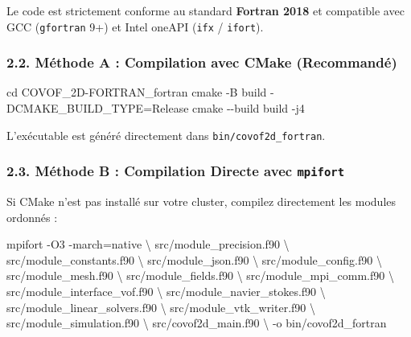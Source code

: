 \documentclass[
  french,
]{article}
\newenvironment{Shaded}{}{}
\newcommand{\AttributeTok}[1]{\textcolor[rgb]{0.49,0.56,0.16}{#1}}
\newcommand{\BuiltInTok}[1]{\textcolor[rgb]{0.00,0.50,0.00}{#1}}
\newcommand{\DataTypeTok}[1]{\textcolor[rgb]{0.56,0.13,0.00}{#1}}
\newcommand{\ExtensionTok}[1]{#1}
\newcommand{\FunctionTok}[1]{\textcolor[rgb]{0.02,0.16,0.49}{#1}}
\newcommand{\NormalTok}[1]{#1}
\newcommand{\OperatorTok}[1]{\textcolor[rgb]{0.40,0.40,0.40}{#1}}
\begin{document}
Le code est strictement conforme au standard \textbf{Fortran 2018} et
compatible avec GCC (\texttt{gfortran} 9+) et Intel oneAPI (\texttt{ifx}
/ \texttt{ifort}).

\subsubsection{2.2. Méthode A : Compilation avec CMake
(Recommandé)}\label{muxe9thode-a-compilation-avec-cmake-recommanduxe9}

\begin{Shaded}
\begin{Highlighting}[]
\BuiltInTok{cd}\NormalTok{ COVOF\_2D{-}FORTRAN\_fortran}
\FunctionTok{cmake} \AttributeTok{{-}B}\NormalTok{ build }\AttributeTok{{-}DCMAKE\_BUILD\_TYPE}\OperatorTok{=}\NormalTok{Release}
\FunctionTok{cmake} \AttributeTok{{-}{-}build}\NormalTok{ build }\AttributeTok{{-}j4}
\end{Highlighting}
\end{Shaded}

L'exécutable est généré directement dans \texttt{bin/covof2d\_fortran}.

\subsubsection{\texorpdfstring{2.3. Méthode B : Compilation Directe avec
\texttt{mpifort}}{2.3. Méthode B : Compilation Directe avec mpifort}}\label{muxe9thode-b-compilation-directe-avec-mpifort}

Si CMake n'est pas installé sur votre cluster, compilez directement les
modules ordonnés :

\begin{Shaded}
\begin{Highlighting}[]
\ExtensionTok{mpifort} \AttributeTok{{-}O3} \AttributeTok{{-}march}\OperatorTok{=}\NormalTok{native }\DataTypeTok{\textbackslash{}}
\NormalTok{  src/module\_precision.f90 }\DataTypeTok{\textbackslash{}}
\NormalTok{  src/module\_constants.f90 }\DataTypeTok{\textbackslash{}}
\NormalTok{  src/module\_json.f90 }\DataTypeTok{\textbackslash{}}
\NormalTok{  src/module\_config.f90 }\DataTypeTok{\textbackslash{}}
\NormalTok{  src/module\_mesh.f90 }\DataTypeTok{\textbackslash{}}
\NormalTok{  src/module\_fields.f90 }\DataTypeTok{\textbackslash{}}
\NormalTok{  src/module\_mpi\_comm.f90 }\DataTypeTok{\textbackslash{}}
\NormalTok{  src/module\_interface\_vof.f90 }\DataTypeTok{\textbackslash{}}
\NormalTok{  src/module\_navier\_stokes.f90 }\DataTypeTok{\textbackslash{}}
\NormalTok{  src/module\_linear\_solvers.f90 }\DataTypeTok{\textbackslash{}}
\NormalTok{  src/module\_vtk\_writer.f90 }\DataTypeTok{\textbackslash{}}
\NormalTok{  src/module\_simulation.f90 }\DataTypeTok{\textbackslash{}}
\NormalTok{  src/covof2d\_main.f90 }\DataTypeTok{\textbackslash{}}
  \AttributeTok{{-}o}\NormalTok{ bin/covof2d\_fortran}
\end{Highlighting}
\end{Shaded}
\end{document}
